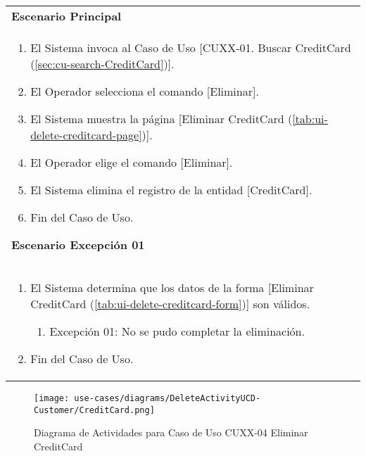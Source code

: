 	\begin{tabular}{ p{15.5cm} }
		\textbf{Escenario Principal} \\
		\begin{enumerate}
			\item El Sistema invoca al Caso de Uso [CUXX-01. Buscar CreditCard (\ref{sec:cu-search-CreditCard})].
			\item El Operador selecciona el comando [Eliminar].
			\item El Sistema muestra la p\'agina [Eliminar CreditCard (\ref{tab:ui-delete-creditcard-page})].
			\item El Operador elige el comando [Eliminar].
			\item El Sistema elimina el registro de la entidad [CreditCard].
			\item Fin del Caso de Uso.
		\end{enumerate}
		\textbf{Escenario Excepci\'on 01} \\
		\begin{enumerate}
		   \item El Sistema determina que los datos de la forma [Eliminar CreditCard (\ref{tab:ui-delete-creditcard-form})] son v\'alidos.
		   	\begin{enumerate}
		   		\item Excepci\'on 01: No se pudo completar la eliminaci\'on.
		    \end{enumerate}
		   \item Fin del Caso de Uso.
		\end{enumerate}
	\end{tabular}
	
	\begin{figure}[H]
	  \begin{center}
		 \label{tab:activity-delete-ucd-entity-creditcard}
		 \texttt{[image: use-cases/diagrams/DeleteActivityUCD-Customer/CreditCard.png]}
		 \caption{Diagrama de Actividades para Caso de Uso CUXX-04 Eliminar CreditCard}
	  \end{center}
	\end{figure}
	
